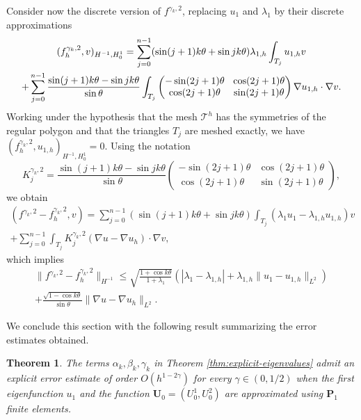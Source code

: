 \documentclass[11pt]{article}
\numberwithin{equation}{section}\newtheorem*{jepEnonce}{\jepEnonceTitle}\newenvironment{enonce*}[1]{\def\jepEnonceTitle{#1}\jepEnonce}{\endjepEnonce}\newtheorem*{conj*}{Conjecture}
\newcommand{\colsep}{\arraycolsep4.5pt}
\theoremstyle{plain}
\newtheorem{thm}{Theorem}[section]
\theoremstyle{definition}
\newcommand{\bo}[1]{{\boldsymbol#1}}
\begin{document}
Consider now the discrete version of $f^{\gamma_k,2}$, replacing $u_1$ and $\lambda_1$ by their discrete approximations
\vspace*{-5pt}
\begin{multline*}
(f_h^{\gamma_k,2},v)_{H^{-1},H_0^1} = \sum_{j=0}^{n-1} (\sin(j+1)k\theta+\sin jk\theta) \lambda_{1,h} \int_{T_j} u_{1,h}v\\
\colsep+ \sum_{j=0}^{n-1} \frac{\sin(j+1)k\theta-\sin jk\theta}{\sin \theta} \int_{T_j}\begin{pmatrix}
-\sin (2j+1)\theta & \cos (2j+1) \theta \\
\cos (2j+1)\theta & \sin (2j+1)\theta
\end{pmatrix}\nabla u_{1,h} \cdot \nabla v.
\end{multline*}
Working under the hypothesis that the mesh $\mathcal T^h$ has the symmetries of the regular polygon and that the triangles $T_j$ are meshed exactly, we have $(f_h^{\gamma_k,2},u_{1,h})_{H^{-1},H_0^1} = 0$. Using the notation
\[
K_j^{\gamma_k,2} = \frac{\sin(j+1)k\theta-\sin jk\theta}{\sin \theta} \begin{pmatrix}
-\sin (2j+1)\theta & \cos (2j+1) \theta \\
\cos(2j+1)\theta & \sin (2j+1)\theta
\end{pmatrix},
\]
we obtain\vspace*{-5pt}
\begin{multline*}
(f^{\gamma_k,2}-f^{\gamma_k,2}_h,v) = \sum_{j=0}^{n-1} (\sin (j+1)k\theta+\sin jk\theta) \int_{T_j}(\lambda_1 u_1-\lambda_{1,h}u_{1,h})v\\[-10pt]
+ \sum_{j=0}^{n-1} \int_{T_j}K_j^{\gamma_k,2}(\nabla u - \nabla u_h)\cdot \nabla v,
\end{multline*}
which implies\vspace*{-5pt}
\begin{multline*}
\|f^{\gamma_k,2}-f_h^{\gamma_k,2} \|_{H^{-1}} \leq \sqrt{\frac{1+\cos k\theta}{1+\lambda_1}}(|\lambda_1-\lambda_{1,h}|+\lambda_{1,h}\|u_1-u_{1,h}\|_{L^2}) \\
+ \frac{\sqrt{1-\cos k\theta}}{\sin \theta} \|\nabla u-\nabla u_h\|_{L^2}.
\end{multline*}

We conclude this section with the following result summarizing the error estimates obtained.

\begin{thm}
The terms $\alpha_k,\beta_k,\gamma_k$ in Theorem \ref{thm:explicit-eigenvalues} admit an explicit error estimate of order $O(h^{1-2\gamma})$ for every $\gamma \in (0,1/2)$ when the first eigenfunction $u_1$ and the function $\bo U_0=(U_0^1,U_0^2)$ are approximated using $\bo P_1$ finite elements.
\label{thm:estimate-abc-P1}
\end{thm}
\end{document}
